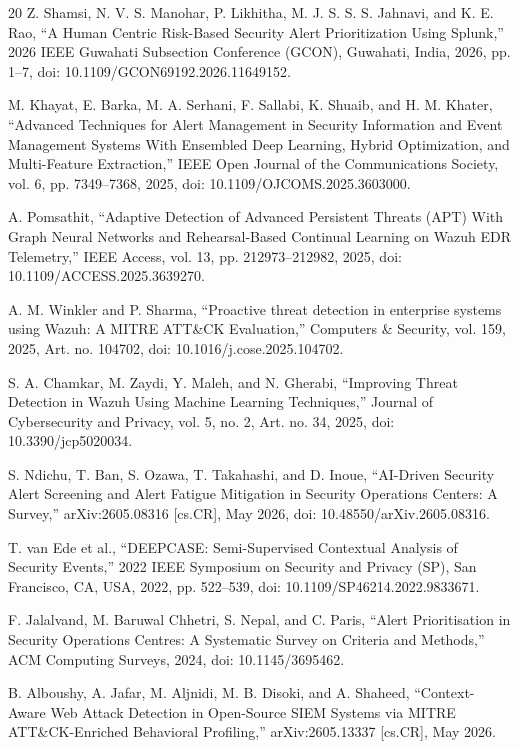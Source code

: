\documentclass[conference]{IEEEtran}
\begin{document}
\begin{thebibliography}{20}
 Z. Shamsi, N. V. S. Manohar, P. Likhitha, M. J. S. S. S. Jahnavi, and K. E. Rao, ``A Human Centric Risk-Based Security Alert Prioritization Using Splunk,'' 2026 IEEE Guwahati Subsection Conference (GCON), Guwahati, India, 2026, pp. 1--7, doi: 10.1109/GCON69192.2026.11649152.

 M. Khayat, E. Barka, M. A. Serhani, F. Sallabi, K. Shuaib, and H. M. Khater, ``Advanced Techniques for Alert Management in Security Information and Event Management Systems With Ensembled Deep Learning, Hybrid Optimization, and Multi-Feature Extraction,'' IEEE Open Journal of the Communications Society, vol. 6, pp. 7349--7368, 2025, doi: 10.1109/OJCOMS.2025.3603000.

 A. Pomsathit, ``Adaptive Detection of Advanced Persistent Threats (APT) With Graph Neural Networks and Rehearsal-Based Continual Learning on Wazuh EDR Telemetry,'' IEEE Access, vol. 13, pp. 212973--212982, 2025, doi: 10.1109/ACCESS.2025.3639270.

 A. M. Winkler and P. Sharma, ``Proactive threat detection in enterprise systems using Wazuh: A MITRE ATT\&CK Evaluation,'' Computers \& Security, vol. 159, 2025, Art. no. 104702, doi: 10.1016/j.cose.2025.104702.

 S. A. Chamkar, M. Zaydi, Y. Maleh, and N. Gherabi, ``Improving Threat Detection in Wazuh Using Machine Learning Techniques,'' Journal of Cybersecurity and Privacy, vol. 5, no. 2, Art. no. 34, 2025, doi: 10.3390/jcp5020034.

 S. Ndichu, T. Ban, S. Ozawa, T. Takahashi, and D. Inoue, ``AI-Driven Security Alert Screening and Alert Fatigue Mitigation in Security Operations Centers: A Survey,'' arXiv:2605.08316 [cs.CR], May 2026, doi: 10.48550/arXiv.2605.08316.

 T. van Ede et al., ``DEEPCASE: Semi-Supervised Contextual Analysis of Security Events,'' 2022 IEEE Symposium on Security and Privacy (SP), San Francisco, CA, USA, 2022, pp. 522--539, doi: 10.1109/SP46214.2022.9833671.

 F. Jalalvand, M. Baruwal Chhetri, S. Nepal, and C. Paris, ``Alert Prioritisation in Security Operations Centres: A Systematic Survey on Criteria and Methods,'' ACM Computing Surveys, 2024, doi: 10.1145/3695462.

 B. Alboushy, A. Jafar, M. Aljnidi, M. B. Disoki, and A. Shaheed, ``Context-Aware Web Attack Detection in Open-Source SIEM Systems via MITRE ATT\&CK-Enriched Behavioral Profiling,'' arXiv:2605.13337 [cs.CR], May 2026.


\end{thebibliography}
\end{document}
